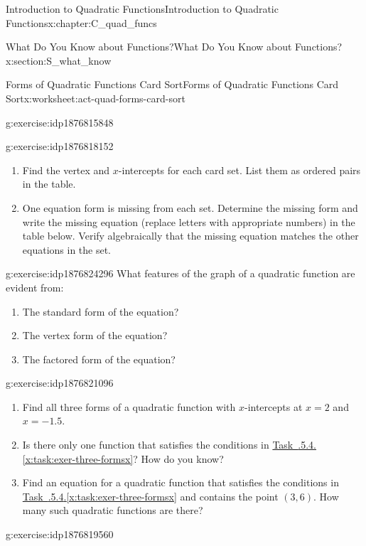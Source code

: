 \documentclass[oneside,10pt,]{book}
\newcommand{\xreffont}{\relax}
\numberwithin{equation}{chapter}
\begin{document}
\begin{chapterptx}{Introduction to Quadratic Functions}{}{Introduction to Quadratic Functions}{}{}{x:chapter:C_quad_funcs}
\begin{sectionptx}{What Do You Know about Functions?}{}{What Do You Know about Functions?}{}{}{x:section:S_what_know}
\begin{worksheet-subsection}{Forms of Quadratic Functions Card Sort}{}{Forms of Quadratic Functions Card Sort}{}{}{x:worksheet:act-quad-forms-card-sort}
\begin{divisionexercise}{1}{}{}{g:exercise:idp1876815848}
\begin{enumerate}[font=\bfseries,label=(\alph*),ref=\alph*]
\end{enumerate}
\end{divisionexercise}%
\begin{divisionexercise}{2}{}{}{g:exercise:idp1876818152}%
\begin{enumerate}[font=\bfseries,label=(\alph*),ref=\alph*]
\item{}Find the vertex and \(x\)-intercepts for each card set. List them as ordered pairs in the table.%
\item{}One equation form is missing from each set. Determine the missing form and write the missing equation (replace letters with appropriate numbers) in the table below. Verify algebraically that the missing equation matches the other equations in the set.%
\end{enumerate}
\end{divisionexercise}%
\begin{divisionexercise}{3}{}{}{g:exercise:idp1876824296}%
What features of the graph of a quadratic function are evident from:%
\begin{enumerate}[font=\bfseries,label=(\alph*),ref=\alph*]
\item{}The standard form of the equation?%
\item{}The vertex form of the equation?%
\item{}The factored form of the equation?%
\end{enumerate}
\end{divisionexercise}%
\begin{divisionexercise}{4}{}{}{g:exercise:idp1876821096}%
\begin{enumerate}[font=\bfseries,label=(\alph*),ref=\alph*]
\item\label{x:task:exer-three-formsx}Find all three forms of a quadratic function with \(x\)-intercepts at \(x = 2\) and \(x = -1.5\).%
\item{}Is there only one function that satisfies the conditions in \hyperref[x:task:exer-three-formsx]{Task~{\xreffont 4.6.5.4}.{\xreffont\ref{x:task:exer-three-formsx}}}? How do you know?%
\item{}Find an equation for a quadratic function that satisfies the conditions in \hyperref[x:task:exer-three-formsx]{Task~{\xreffont 4.6.5.4}.{\xreffont\ref{x:task:exer-three-formsx}}} and contains the point \((3, 6)\). How many such quadratic functions are there?%
\end{enumerate}
\end{divisionexercise}%
\begin{divisionexercise}{5}{}{}{g:exercise:idp1876819560}%

\end{divisionexercise}
\end{worksheet-subsection}
\end{sectionptx}
\end{chapterptx}
\end{document}
